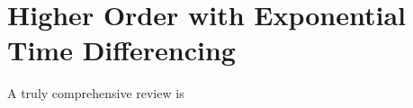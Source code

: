 \chapter{Higher Order with Exponential Time Differencing}
A truly comprehensive review is \cite{hochbruck2010exponential}